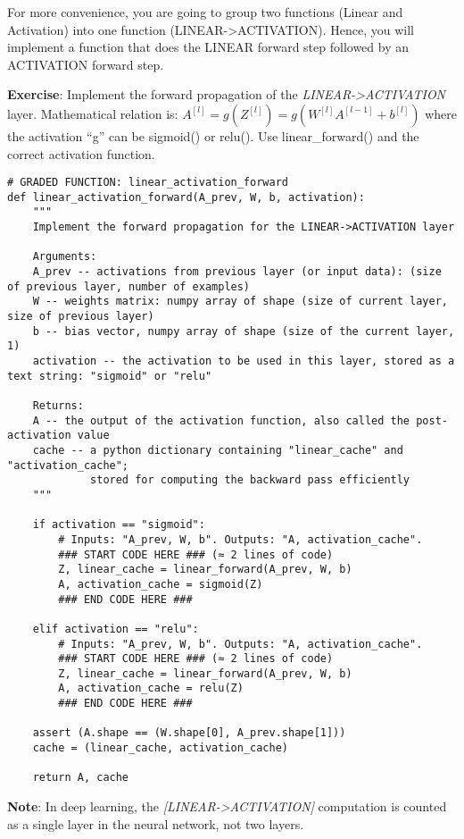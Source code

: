 {For more convenience, you are going to group two functions (Linear and Activation) into one function (LINEAR->ACTIVATION). Hence, you will implement a function that does the LINEAR forward step followed by an ACTIVATION forward step.

{\textbf {Exercise}}: Implement the forward propagation of the \emph{LINEAR->ACTIVATION} layer. Mathematical relation is: $A^{[l]} = g(Z^{[l]}) = g(W^{[l]}A^{[l-1]} +b^{[l]})$ where the activation ``g'' can be sigmoid() or relu(). Use linear\_forward() and the correct activation function.


\begin{verbatim} 
# GRADED FUNCTION: linear_activation_forward
def linear_activation_forward(A_prev, W, b, activation):
    """
    Implement the forward propagation for the LINEAR->ACTIVATION layer

    Arguments:
    A_prev -- activations from previous layer (or input data): (size of previous layer, number of examples)
    W -- weights matrix: numpy array of shape (size of current layer, size of previous layer)
    b -- bias vector, numpy array of shape (size of the current layer, 1)
    activation -- the activation to be used in this layer, stored as a text string: "sigmoid" or "relu"

    Returns:
    A -- the output of the activation function, also called the post-activation value 
    cache -- a python dictionary containing "linear_cache" and "activation_cache";
             stored for computing the backward pass efficiently
    """
    
    if activation == "sigmoid":
        # Inputs: "A_prev, W, b". Outputs: "A, activation_cache".
        ### START CODE HERE ### (≈ 2 lines of code)
        Z, linear_cache = linear_forward(A_prev, W, b)
        A, activation_cache = sigmoid(Z)
        ### END CODE HERE ###
    
    elif activation == "relu":
        # Inputs: "A_prev, W, b". Outputs: "A, activation_cache".
        ### START CODE HERE ### (≈ 2 lines of code)
        Z, linear_cache = linear_forward(A_prev, W, b)
        A, activation_cache = relu(Z)
        ### END CODE HERE ###
    
    assert (A.shape == (W.shape[0], A_prev.shape[1]))
    cache = (linear_cache, activation_cache)

    return A, cache
\end{verbatim}  

{\textbf {Note}}: In deep learning, the \emph{[LINEAR->ACTIVATION]} computation is counted as a single layer in the neural network, not two layers.    


}
